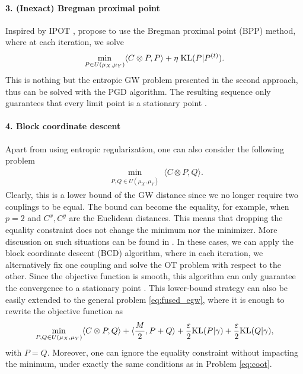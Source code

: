 \paragraph{3. (Inexact) Bregman proximal point} Inspired by IPOT \citep{Xie20}, \citep{Xu19, Xu19b}
propose to use the Bregman proximal point (BPP) method, where at each iteration, we solve
\begin{align}
  \min_{P \in U(\mu_X, \mu_Y)} \langle C \otimes P, P \rangle + \eta \; \text{KL}(P | P^{(t)}).
\end{align}
This is nothing but the entropic GW problem presented in the second approach, thus can be solved
with the PGD algorithm. The resulting sequence only guarantees that
every limit point is a stationary point \citep{Xu19}.

\paragraph{4. Block coordinate descent} Apart from using entropic regularization,
one can also consider the following problem
\begin{align}
  \label{eq:coot}
  \min_{\substack{P, Q \in U(\mu_X, \mu_Y)}} \langle C \otimes P, Q \rangle.
\end{align}
Clearly, this is a lower bound of the GW distance since we no longer require two couplings to be equal.
The bound can become the equality, for example, when $p=2$ and $C^x, C^y$ are the Euclidean distances.
This means that dropping the equality constraint does not change the minimum nor the minimizer.
More discussion on such situations can be found in .
In these cases, we can apply the block coordinate descent (BCD) algorithm,
where in each iteration, we alternatively fix one coupling and solve the OT problem
with respect to the other. Since the objective function is smooth,
this algorithm can only guarantee the convergence to a stationary point \citep{Tseng01}.
This lower-bound strategy can also be easily extended to the general problem \eqref{eq:fused_egw},
where it is enough to rewrite the objective function as
\begin{align}
  \min_{\substack{P, Q \in U(\mu_X, \mu_Y)}} \langle C \otimes P, Q \rangle
  + \langle \frac{M}{2}, P + Q \rangle + \frac{\varepsilon}{2} \text{KL}(P | \gamma)
  + \frac{\varepsilon}{2} \text{KL}(Q | \gamma),
\end{align}
with $P = Q$. Moreover, one can ignore the equality constraint without impacting the minimum,
under exactly the same conditions as in Problem \eqref{eq:coot}.

